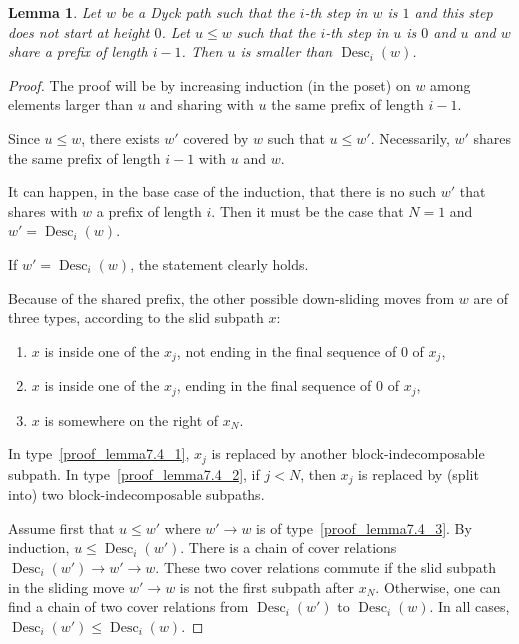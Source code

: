 \documentclass[10pt]{article}
\newtheorem{lemma}[lemma]{Lemma}
\theoremstyle{definition}
\DeclareMathOperator{\des}{Desc}
\begin{document}
\begin{lemma}
  \label{sub_force_0}
  Let $w$ be a Dyck path such that the $i$-th step in $w$ is $1$ and
  this step does not start at height $0$. Let $u \leq w$ such that the
  $i$-th step in $u$ is $0$ and $u$ and $w$ share a prefix
  of length $i - 1$. Then $u$ is smaller than $\des_i(w)$.
\end{lemma}
\begin{proof}
  The proof will be by increasing induction (in the poset) on $w$
  among elements larger than $u$ and sharing with $u$ the same prefix
  of length $i - 1$.

  Since $u \leq w$, there exists $w'$ covered by $w$ such that
  $u \leq w'$. Necessarily, $w'$ shares the same prefix of length
  $i-1$ with $u$ and $w$.

  It can happen, in the base case of the induction, that there is no
  such $w'$ that shares with $w$ a prefix of length $i$. Then it must
  be the case that $N=1$ and $w' = \des_i(w)$.

  If $w' = \des_i(w)$, the statement clearly holds.

  Because of the shared prefix, the other possible down-sliding moves
  from $w$ are of three types, according to the slid subpath $x$:
  \begin{enumerate}%
  \item\label{proof_lemma7.4_1} $x$ is inside one of the $x_j$, not ending in the final
    sequence of $0$ of $x_j$,
  \item\label{proof_lemma7.4_2} $x$ is inside one of the $x_j$, ending in the final
    sequence of $0$ of $x_j$,
  \item\label{proof_lemma7.4_3} $x$ is somewhere on the right of $x_N$.
  \end{enumerate}

  In type~\eqref{proof_lemma7.4_1}, $x_j$ is replaced by another block-indecomposable
  subpath. In type~\eqref{proof_lemma7.4_2}, if $j < N$, then $x_j$ is replaced by (split
  into) two block-indecomposable subpaths.

  Assume first that $u \leq w'$ where $w' \to w$ is of type~\eqref{proof_lemma7.4_3}. By
  induction, $u \leq \des_i(w')$. There is a chain of cover relations
  $\des_i(w') \to w' \to w$. These two cover relations commute if the slid
  subpath in the sliding move $w' \to w$ is not the first subpath after
  $x_N$. Otherwise, one can find a chain of two cover relations from
  $\des_i(w')$ to $\des_i(w)$. In all cases,
  $\des_i(w') \leq \des_i(w)$.


\end{proof}
\end{document}
